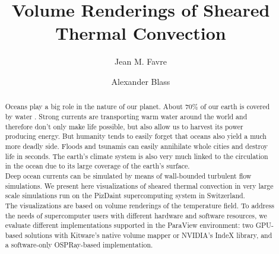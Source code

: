 \documentclass[final,5p,times,twocolumn]{elsarticle}
\begin{document}
\begin{frontmatter}



\title{Volume Renderings of Sheared Thermal Convection}


\author[CSCS]{Jean M. Favre}
\author[Twente]{Alexander Blass}

\address[CSCS]{Swiss National Supercomputing Center (CSCS), Via Trevano 131, CH-6900 Lugano, Switzerland}
\address[Twente]{Physics of Fluids Group, Max Planck Center for Complex Fluid Dynamics,
J. M. Burgers Center for Fluid Dynamics and MESA+ Research Institute,
Department of Science and Technology,
University of Twente, P.O. Box 217, 7500 AE Enschede, The Netherlands}

\begin{abstract}
Oceans play a big role in the nature of our planet. About $ 70 \% $ of our earth
is covered by water \cite{int14}. Strong currents are transporting warm water around the world
and therefore don't only make life possible, but also allow us to harvest its
power producing energy. But humanity tends to easily forget that oceans also
yield a much more deadly side. Floods and tsunamis can easily annihilate whole
cities and destroy life in seconds. The earth's climate system is also very much
linked to the circulation in the ocean due to its large coverage of the earth's surface. \\
Deep ocean currents can be simulated by means of wall-bounded turbulent flow simulations. We present here visualizations of sheared thermal convection in very large scale simulations run on the PizDaint supercomputing system in Switzerland. \\
The visualizations are based on volume renderings of the temperature field. To address the needs of supercomputer users
with different hardware and software resources, we evaluate different implementations
supported in the ParaView \cite{Ahrens2005} environment: two GPU-based solutions
with Kitware's native volume mapper or NVIDIA's IndeX library, and a software-only
OSPRay-based implementation.


\end{abstract}
\end{frontmatter}
\end{document}
